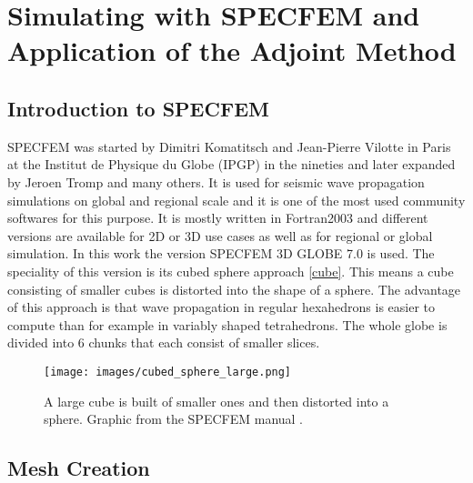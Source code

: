 


\section{Simulating with SPECFEM and Application of the Adjoint Method}

\subsection{Introduction to SPECFEM}

SPECFEM was started by Dimitri Komatitsch and Jean-Pierre Vilotte in Paris at the 
Institut de Physique du Globe (IPGP) \citep{Vilotte1998} in the nineties and later expanded by Jeroen Tromp and many others. 
It is used for seismic wave propagation simulations on global and regional scale and it is one of the 
most used community softwares for this purpose. 
It is mostly written in Fortran2003 and different versions are available for 2D or 3D use cases as well
as for regional or global simulation. 
In this work the version SPECFEM 3D GLOBE 7.0 is used.
The speciality of this version is its cubed sphere approach \autoref{cube}.
This means a cube consisting of smaller cubes is distorted into the shape of a sphere.
The advantage of this approach is that wave propagation in regular hexahedrons is easier to compute than
for example in variably shaped tetrahedrons. %
The whole globe is divided into 6 chunks that each consist of smaller slices.



\begin{figure}[h]
\begin{center}
\texttt{[image: images/cubed\_sphere\_large.png]}
\caption[The cubed sphere method.]{A large cube is built of smaller ones and then distorted into a sphere.
Graphic from the SPECFEM manual \citep{specfem_manual}.}
\label{cube}
\end{center}
\end{figure}


\subsection{Mesh Creation}

